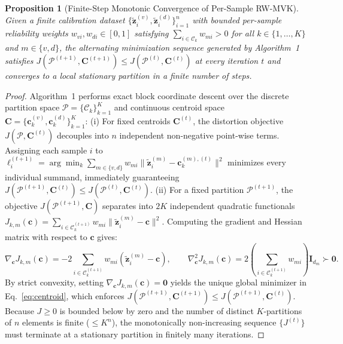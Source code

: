 \documentclass[11pt, a4paper]{article}
\newtheorem{proposition}{Proposition}
\begin{document}
\begin{proposition}[Finite-Step Monotonic Convergence of Per-Sample RW-MVK]
\label{prop:convergence}
Given a finite calibration dataset $\{\tilde{\mathbf{z}}_i^{(v)}, \tilde{\mathbf{z}}_i^{(d)}\}_{i=1}^n$ with bounded per-sample reliability weights $w_{vi}, w_{di} \in [0, 1]$ satisfying $\sum_{i\in\mathcal{C}_k} w_{mi} > 0$ for all $k \in \{1,\dots,K\}$ and $m \in \{v, d\}$, the alternating minimization sequence generated by Algorithm~1 satisfies $J(\mathcal{P}^{(t+1)}, \mathbf{C}^{(t+1)}) \le J(\mathcal{P}^{(t)}, \mathbf{C}^{(t)})$ at every iteration $t$ and converges to a local stationary partition in a finite number of steps.
\end{proposition}
\begin{proof}
Algorithm~1 performs exact block coordinate descent over the discrete partition space $\mathcal{P} = \{\mathcal{C}_k\}_{k=1}^K$ and continuous centroid space $\mathbf{C} = \{\mathbf{c}_k^{(v)}, \mathbf{c}_k^{(d)}\}_{k=1}^K$:
(i) For fixed centroids $\mathbf{C}^{(t)}$, the distortion objective $J(\mathcal{P}, \mathbf{C}^{(t)})$ decouples into $n$ independent non-negative point-wise terms. Assigning each sample $i$ to $\ell_i^{(t+1)} = \arg\min_{k} \sum_{m\in\{v,d\}} w_{mi}\|\tilde{\mathbf{z}}_i^{(m)} - \mathbf{c}_k^{(m),(t)}\|^2$ minimizes every individual summand, immediately guaranteeing $J(\mathcal{P}^{(t+1)}, \mathbf{C}^{(t)}) \le J(\mathcal{P}^{(t)}, \mathbf{C}^{(t)})$.
(ii) For a fixed partition $\mathcal{P}^{(t+1)}$, the objective $J(\mathcal{P}^{(t+1)}, \mathbf{C})$ separates into $2K$ independent quadratic functionals $J_{k,m}(\mathbf{c}) = \sum_{i\in\mathcal{C}_k^{(t+1)}} w_{mi}\|\tilde{\mathbf{z}}_i^{(m)} - \mathbf{c}\|^2$. Computing the gradient and Hessian matrix with respect to $\mathbf{c}$ gives:
\begin{equation}
\nabla_{\mathbf{c}} J_{k,m}(\mathbf{c}) = -2\sum_{i\in\mathcal{C}_k^{(t+1)}} w_{mi}(\tilde{\mathbf{z}}_i^{(m)} - \mathbf{c}), \qquad
\nabla^2_{\mathbf{c}} J_{k,m}(\mathbf{c}) = 2\left(\sum_{i\in\mathcal{C}_k^{(t+1)}} w_{mi}\right)\mathbf{I}_{d_m} \succ \mathbf{0}.
\end{equation}
By strict convexity, setting $\nabla_{\mathbf{c}} J_{k,m}(\mathbf{c}) = \mathbf{0}$ yields the unique global minimizer in Eq.~\eqref{eq:centroid}, which enforces $J(\mathcal{P}^{(t+1)}, \mathbf{C}^{(t+1)}) \le J(\mathcal{P}^{(t+1)}, \mathbf{C}^{(t)})$. Because $J \ge 0$ is bounded below by zero and the number of distinct $K$-partitions of $n$ elements is finite ($\le K^n$), the monotonically non-increasing sequence $\{J^{(t)}\}$ must terminate at a stationary partition in finitely many iterations.
\end{proof}
\end{document}
